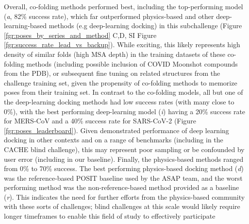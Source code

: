 \documentclass[journal=jcim,manuscript=article]{achemso}
\begin{document}
Overall, co-folding methods performed best, including the top-performing model (\textit{a}, 82\% success rate), which far outperformed physics-based and other deep-learning-based methods (e.g deep-learning docking) in this subchallenge (Figure \ref{fgr:poses_by_series_and_method} C,D, SI Figure \ref{fgr:success_rate_lead_vs_backup}). While exciting, this likely represents high density of similar folds (high MSA depth) in the training datasets of these co-folding methods (including possible inclusion of COVID Moonshot compounds from the PDB), or subsequent fine tuning on related structures from the challenge training set, given the propensity of co-folding methods to memorize poses from their training set\cite{skrinjar_cofold_mem_2025}. In contrast to the co-folding models, all but one of the deep-learning docking methods had low success rates (with many close to 0\%), with the best performing deep-learning model (\textit{i}) having a 20\% success rate for MERS-CoV and a 40\% success rate for SARS-CoV-2 (Figure \ref{fgr:poses_leaderboard}). Given demonstrated performance of deep learning docking in other contexts and on a range of benchmarks (including in the CACHE blind challenge\cite{dunn_cache_2024}), this may represent poor sampling or be confounded by user error (including in our baseline).  Finally, the physics-based methods ranged from 0\% to 70\% success. The best performing physics-based docking method (\textit{d}) was the reference-based POSIT baseline used by the ASAP team, and the worst performing method was the non-reference-based method provided as a baseline (\textit{r}). This indicates the need for further efforts from the physics-based community with these sorts of challenges; blind challenges at this scale would likely require longer timeframes to enable this field of study to effectively participate
\end{document}
